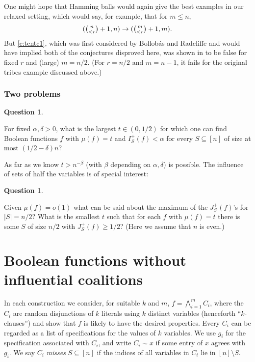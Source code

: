\documentclass[11pt]{article}
\numberwithin{equation}{section}
\theoremstyle{definition}
\newtheorem{question}[theorem]{Question}
\theoremstyle{plain}
\newcommand{\nin}[0]{\noindent}
\newcommand{\sub}[0]{\subseteq}
\newcommand{\sm}[0]{\setminus}
\newcommand{\0}[0]{\emptyset}
\newcommand{\Cc}[0]{\tbinom}
\newcommand{\ga}[0]{\alpha }
\newcommand{\gb}[0]{\beta }
\newcommand{\gd}[0]{\delta }
\begin{document}
\medskip
One might hope that Hamming balls would again give the
best examples in our relaxed setting, which would say, for example,
that for $m \le n$,
\begin {equation}
\label{e:tentc1}
(\Cc{n}{< r}+1,n) \to (\Cc{m}{< r}+1,m).
\end {equation}
But \eqref{e:tentc1}, which was first considered by
Bollob\'as and Radcliffe \cite{BR}
and would have implied both of the conjectures
disproved here,
was shown in \cite{BR} to be false
for fixed $r$ and (large) $m=n/2$.
(For $r=n/2$
and $m=n-1$, it fails for the original tribes example
discussed above.)



%
%
%
%
%
%
%
%
%
%
%
%
%
%

%


\subsubsection* {Two problems}


\begin{question}\label{prop4}

For fixed $\alpha,\delta >0$, what is
the largest $t\in (0,1/2)$ for which one can find
Boolean functions $f$ with $\mu(f) =t$ and
$I^+_S(f)<\ga$ for every $S\sub [n]$ of size
at most %
$(1/2-\gd)n$?
\end{question}

\nin
As far as we know $t> n^{-\gb}$ (with $\gb$ depending on $\ga,\gd$)
is possible. The influence of sets of half the variables is of special interest:

\begin{question}\label{prop5}

Given $\mu(f) =o(1)$ what can be said about 
the maximum of
the   %
$J_S^+(f)$'s for $|S|=n/2$?  %
What is the smallest $t$ 
such that for each $f$ with $\mu(f) =t$ there is some
$S$ of size $n/2$ with $J_S^+(f) \ge 1/2 ?$
(Here we assume that $n$ is even.)  %
\end{question}



\section{Boolean functions without influential coalitions}
\label{examples}


In each construction we consider, for suitable $k$ and $m$,
%
$f= \bigwedge_{i=1}^m C_i$, where the  %
%
$C_i$   %
%
%
%
are random %
disjunctions  %
of $k$ literals
using $k$ distinct variables (henceforth ``$k$-clauses'')
and show that $f$ is likely to have the desired properties. 
Every $C_i$ can be regarded as a list of specifications for 
the values of $k$ variables.
We use $g_i$ for the specification associated with $C_i$,
and write $C_i\sim x$ if some entry of $x$ agrees with $g_i$.
We say $C_i$ \emph{misses} $S\sub [n]$ if the indices of all
variables in $C_i$ lie in $[n]\sm S$.
\end{document}
